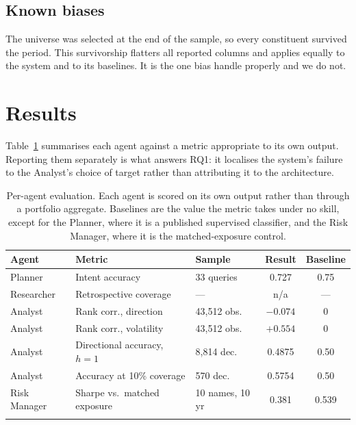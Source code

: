 \documentclass[pdflatex,sn-apa]{sn-jnl}%
\theoremstyle{thmstyleone}%
\theoremstyle{thmstyletwo}%
\theoremstyle{thmstylethree}%
\begin{document}
\subsection{Known biases}\label{subsec:protocol-bias}

The universe was selected at the end of the sample, so every constituent
survived the period. This survivorship flatters all reported columns and
applies equally to the system and to its baselines. It is the one bias
\citet{li2025finsaber} handle properly and we do not.

\section{Results}\label{sec:results}

Table~\ref{tab:agents} summarises each agent against a metric appropriate to
its own output. Reporting them separately is what answers RQ1: it localises the
system's failure to the Analyst's choice of target rather than attributing it
to the architecture.

\begin{table}[h]
\caption{Per-agent evaluation. Each agent is scored on its own output rather
than through a portfolio aggregate. Baselines are the value the metric takes
under no skill, except for the Planner, where it is a published supervised
classifier, and the Risk Manager, where it is the matched-exposure
control.}\label{tab:agents}%
\begin{tabular*}{\textwidth}{@{\extracolsep\fill}lllcc@{}}
\toprule
Agent & Metric & Sample & Result & Baseline \\
\midrule
Planner      & Intent accuracy                & 33 queries    & 0.727    & 0.75 \\
Researcher   & Retrospective coverage         & ---           & n/a      & --- \\
Analyst      & Rank corr., direction          & 43{,}512 obs. & $-0.074$ & 0 \\
Analyst      & Rank corr., volatility         & 43{,}512 obs. & $+0.554$ & 0 \\
Analyst      & Directional accuracy, $h{=}1$  & 8{,}814 dec.  & 0.4875   & 0.50 \\
Analyst      & Accuracy at 10\% coverage      & 570 dec.      & 0.5754   & 0.50 \\
Risk Manager & Sharpe vs.\ matched exposure   & 10 names, 10 yr & 0.381  & 0.539 \\
\botrule
\end{tabular*}
\end{table}
\end{document}
